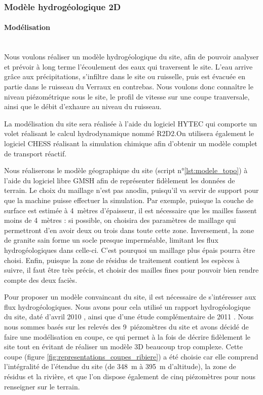 \documentclass{article}
\begin{document}


\subsubsection{Modèle hydrogéologique 2D}
\paragraph{Modélisation \\ \\}
Nous voulons réaliser un modèle hydrogéologique du site, afin de pouvoir analyser et prévoir à long terme l'écoulement des eaux qui traversent le site. L'eau arrive grâce aux précipitations, s'infiltre dans le site ou ruisselle, puis est évacuée en partie dans le ruisseau du Verraux en contrebas. Nous voulons donc connaître le niveau piézométrique sous le site, le profil de vitesse sur une coupe tranversale, ainsi que le débit d'exhaure au niveau du ruisseau.

La modélisation du site sera réalisée à l'aide du logiciel HYTEC qui comporte un volet réalisant le calcul hydrodynamique nommé R2D2.On utilisera également le logiciel CHESS réalisant la simulation chimique \cite{lagneau:hal-00614306} afin d'obtenir un modèle complet de transport réactif. 

Nous réaliserons le modèle géographique du site (script n°\ref{lst:modele_topo}) à l'aide du logiciel libre GMSH \cite{gmsh_site} afin de représenter fidèlement les données de terrain. Le choix du maillage n'est pas anodin, puisqu'il va servir de support pour que la machine puisse effectuer la simulation. Par exemple, puisque la couche de surface est estimée à 4~mètres d'épaisseur, il est nécessaire que les mailles fassent moins de 4~mètres : si possible, on choisira des paramètres de maillage qui permettront d'en avoir deux ou trois dans toute cette zone. Inversement, la zone de granite sain forme un socle presque imperméable, limitant les flux hydrogéologiques dans celle-ci. C'est pourquoi un maillage plus épais pourra être choisi. Enfin, puisque la zone de résidus de traitement contient les espèces à suivre, il faut être très précis, et choisir des mailles fines pour pouvoir bien rendre compte des deux faciès.

Pour proposer un modèle convaincant du site, il est nécessaire de s’intéresser aux flux hydrogéologiques. Nous avons pour cela utilisé un rapport hydrogéologique du site, daté d'avril 2010 \cite{societe_areva_nc_etude_2010}, ainsi que d'une étude complémentaire de 2011 \cite{societe_areva_nc_etude_2011}. Nous nous sommes basés sur les relevés des 9~piézomètres du site et avons décidé de faire une modélisation en coupe, ce qui permet à la fois de décrire fidèlement le site tout en évitant de réaliser un modèle 3D beaucoup trop complexe. Cette coupe (figure \ref{fig:representations_coupes_ribiere}) a été choisie car elle comprend l'intégralité de l'étendue du site (de 348~m à 395~m d'altitude), la zone de résidus et la rivière, et que l'on dispose également de cinq piézomètres pour nous renseigner sur le terrain.
\end{document}
